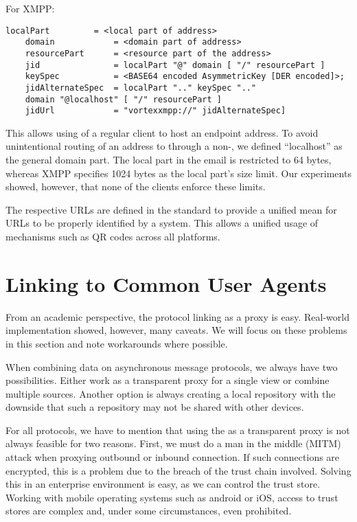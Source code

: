 For XMPP:
\begin{lstlisting}[language=EBNF]
	localPart         = <local part of address>
	domain            = <domain part of address>
	resourcePart      = <resource part of the address>
	jid               = localPart "@" domain [ "/" resourcePart ]
	keySpec           = <BASE64 encoded AsymmetricKey [DER encoded]>;
	jidAlternateSpec  = localPart ".." keySpec ".." 
	domain "@localhost" [ "/" resourcePart ]
	jidUrl            = "vortexxmpp://" jidAlternateSpec]
\end{lstlisting}

This allows using of a regular client to host an \VortexMessage{} endpoint address. To avoid unintentional routing of an address to through a non-\VortexNode{}, we defined ``localhost'' as the general domain part. The local part in the email is restricted to 64 bytes, whereas XMPP specifies 1024 bytes as the local part's size limit. Our experiments showed, however, that none of the clients enforce these limits.

The respective URLs are defined in the standard to provide a unified mean for URLs to be properly identified by a system. This allows a unified usage of mechanisms such as QR codes across all platforms.

\section{Linking to Common User Agents}
From an academic perspective, the protocol linking as a proxy is easy. Real-world implementation showed, however, many caveats. We will focus on these problems in this section and note workarounds where possible.

When combining data on asynchronous message protocols, we always have two possibilities. Either work as a transparent proxy for a single view or combine multiple sources. Another option is always creating a local repository with the downside that such a repository may not be shared with other devices.

For all protocols, we have to mention that using the \VortexNode{} as a transparent proxy is not always feasible for two reasons. First, we must do a man in the middle (MITM) attack when proxying outbound or inbound connection. If such connections are encrypted, this is a problem due to the breach of the trust chain involved. Solving this in an enterprise environment is easy, as we can control the trust store. Working with mobile operating systems such as android or iOS, access to trust stores are complex and, under some circumstances, even prohibited.

